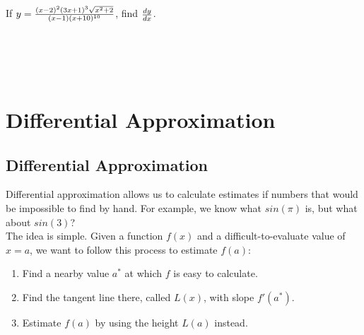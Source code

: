 \begin{exercise}\nonumber
    If $ y = {(x-2)^2(3x+1)^3\sqrt{x^2+2} \over (x-1)(x+10)^{10}} $, find $ dy \over dx $. \\

    \begin{align}
        \\
        \\
        \\
        \\
        \\
        \\
        \\
        \\
        \\
        \\
        \\
        \\
    \end{align}
\end{exercise}

\chapter{Differential Approximation}

\section{Differential Approximation}

Differential approximation allows us to calculate estimates if numbers that would be impossible to find by hand. For example, we know what $ sin(\pi) $ is, but what about $ sin(3) $? \\

The idea is simple. Given a function $ f(x) $ and a difficult-to-evaluate value of $ x = a $, we want to follow this process to estimate $  f(a) $: \\

\begin{enumerate}
    \item
          Find a nearby value $ a^* $ at which $ f $ is easy to calculate. \\

    \item
          Find the tangent line there, called $ L(x) $, with slope $ f'(a^*) $. \\

    \item
          Estimate $ f(a) $ by using the height $ L(a) $ instead. \\
\end{enumerate}

